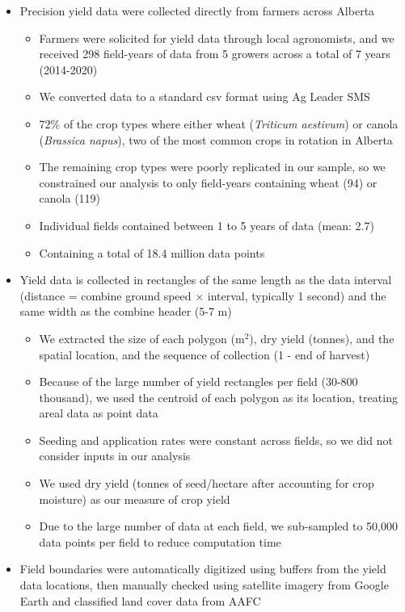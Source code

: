 \documentclass[]{elsarticle} %
\providecommand{\tightlist}{%
  \setlength{\itemsep}{0pt}\setlength{\parskip}{0pt}}
\begin{document}
\begin{itemize}
\tightlist
\item
  Precision yield data were collected directly from farmers across Alberta

  \begin{itemize}
  \tightlist
  \item
    Farmers were solicited for yield data through local agronomists, and we received 298 field-years of data from 5 growers across a total of 7 years (2014-2020)
  \item
    We converted data to a standard csv format using Ag Leader SMS
  \item
    72\% of the crop types where either wheat (\emph{Triticum aestivum}) or canola (\emph{Brassica napus}), two of the most common crops in rotation in Alberta
  \item
    The remaining crop types were poorly replicated in our sample, so we constrained our analysis to only field-years containing wheat (94) or canola (119)
  \item
    Individual fields contained between 1 to 5 years of data (mean: 2.7)
  \item
    Containing a total of 18.4 million data points
  \end{itemize}
\item
  Yield data is collected in rectangles of the same length as the data interval (distance = combine ground speed \(\times\) interval, typically 1 second) and the same width as the combine header (5-7 m)

  \begin{itemize}
  \tightlist
  \item
    We extracted the size of each polygon (m\(^2\)), dry yield (tonnes), and the spatial location, and the sequence of collection (1 - end of harvest)
  \item
    Because of the large number of yield rectangles per field (30-800 thousand), we used the centroid of each polygon as its location, treating areal data as point data
  \item
    Seeding and application rates were constant across fields, so we did not consider inputs in our analysis
  \item
    We used dry yield (tonnes of seed/hectare after accounting for crop moisture) as our measure of crop yield
  \item
    Due to the large number of data at each field, we sub-sampled to 50,000 data points per field to reduce computation time
  \end{itemize}
\item
  Field boundaries were automatically digitized using buffers from the yield data locations, then manually checked using satellite imagery from Google Earth and classified land cover data from AAFC


\end{itemize}
\end{document}
